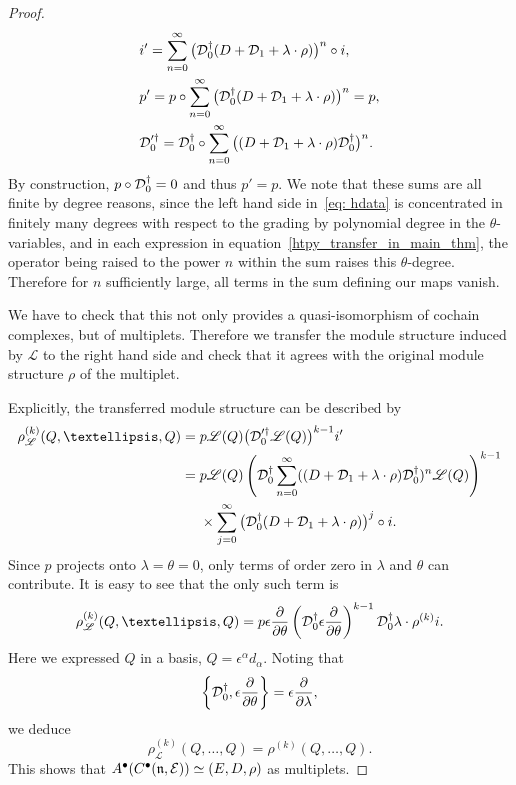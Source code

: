 \documentclass[11pt]{article}
\numberwithin{equation}{section}
\numberwithin{equation}{section}
\def\cE{\mathcal E}\def\cF{\mathcal F}\def\cG{\mathcal G}\def\cH{\mathcal H}
\def\bu{\bullet}
\def\sL{\mathscr L}
\begin{document}
\begin{proof}
	\begin{align}
	&i' = \sum_{n=0}^{\infty} \big(\cD_0^\dagger(D + \cD_1 + \lambda \cdot \rho)\big)^n \circ i,\nonumber \\
	&p' = p \circ \sum_{n=0}^{\infty} \big(\cD_0^\dagger(D + \cD_1 + \lambda \cdot \rho)\big)^n = p,\nonumber \\
	&\cD_0'^\dagger = \cD_0^\dagger \circ \sum_{n = 0}^{\infty} \big((D + \cD_1 + \lambda \cdot \rho) \cD_0^\dagger\big)^n.	\label{htpy_transfer_in_main_thm}
	\end{align}
	By construction, $p \circ \mathcal D_0^\dagger = 0$ and thus $p' = p$. We note that these sums are all finite by degree reasons, since the left hand side in~\eqref{eq: hdata} is concentrated in finitely many degrees with respect to the grading by polynomial degree in the $\theta$-variables, and in each expression in equation~\eqref{htpy_transfer_in_main_thm}, the operator being raised to the power $n$ within the sum raises this $\theta$-degree. Therefore for $n$ sufficiently large, all terms in the sum defining our maps vanish.
	
	We have to check that this not only provides a quasi-isomorphism of cochain complexes, but of multiplets. Therefore we transfer the module structure induced by $\sL$ to the right hand side and check that it agrees with the original module structure $\rho$ of the multiplet.
	
	Explicitly, the transferred module structure can be described by
	\begin{align*}
	\rho_\sL^{(k)} (Q,\dots,Q)={}& p \sL(Q) \big(\cD_0'^\dagger \sL(Q)\big)^{k-1} i' \\
	={}&p \sL(Q) \left(\cD_0^\dagger \sum_{n = 0}^{\infty} ((D + \cD_1 + \lambda \cdot \rho) \cD_0^\dagger)^n \sL(Q)\right)^{k-1}\\
&{}\times \sum_{j=0}^{\infty} \big(\cD_0^\dagger(D + \cD_1 + \lambda \cdot \rho)\big)^j \circ i .
	\end{align*}
	Since $p$ projects onto $\lambda = \theta = 0$, only terms of order zero in $\lambda$ and $\theta$ can contribute. It is easy to see that the only such term is
	\begin{equation*}
	\rho_\sL^{(k)} (Q,\dots,Q) = p \epsilon \frac{\partial}{\partial \theta} \left(\cD_0^\dagger \epsilon \frac{\partial}{\partial \theta}\right)^{k-1} \cD_0^\dagger \lambda \cdot \rho^{(k)} i .
	\end{equation*}
	Here we expressed $Q$ in a basis, $Q = \epsilon^\alpha d_\alpha$.
	Noting that
	\begin{equation*}
	\left\{\mathcal D_0^\dagger , \epsilon \frac{\partial}{\partial \theta}\right\} = \epsilon \frac{\partial}{\partial \lambda} ,
	\end{equation*}
	we deduce
	\begin{equation*}
	\rho_\sL^{(k)} (Q,\dots,Q) = \rho^{(k)} (Q,\dots,Q) .
	\end{equation*}
	This shows that $A^\bu(C^\bu(\fn , \cE)) \simeq (E,D,\rho)$ as multiplets.
	

\end{proof}
\end{document}
